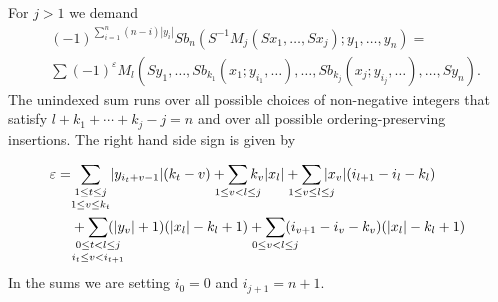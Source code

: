 \documentclass[Thesis.tex]{subfiles}
\begin{document}
\begin{defin}

For $j>1$ we demand
\begin{align*}
&(-1)^{\sum_{i=1}^n(n-i)|y_i|}Sb_n(S^{-1}M_j(Sx_1,\dots, Sx_j);y_1,\dots, y_n)=\\
&\sum(-1)^{\varepsilon}M_l(Sy_1,\dots, Sb_{k_1}(x_1;y_{i_1},\dots),\dots, Sb_{k_j}(x_j;y_{i_j},\dots),\dots, Sy_n).
\end{align*}
The unindexed sum runs over all possible choices of non-negative integers that satisfy $l+k_1+\cdots+k_j-j=n$ and over all possible ordering-preserving insertions. The right hand side sign is given by

\begin{align*}
\varepsilon =& \underset{1\leq v\leq k_t}{\sum_{\mathclap{1\leq t\leq j}}} |y_{i_t+v-1}|(k_t-v)+\sum_{\mathclap{1\leq v< l\leq j}}k_v|x_l|+\sum_{\mathclap{1\leq v\leq l\leq j}} |x_v|(i_{l+1}-i_l-k_l)\\
&+\underset{\mathclap{i_t\leq v< i_{t+1}}}{\sum_{\mathclap{0\leq t< l\leq j}}}(|y_v|+1)(|x_l|-k_l+1)+\sum_{\mathclap{0\leq v<l\leq j}}(i_{v+1}-i_v-k_v)(|x_l|-k_l+1)\
\end{align*}
In the sums we are setting $i_0=0$ and $i_{j+1}=n+1$. %

\end{defin}
\end{document}
